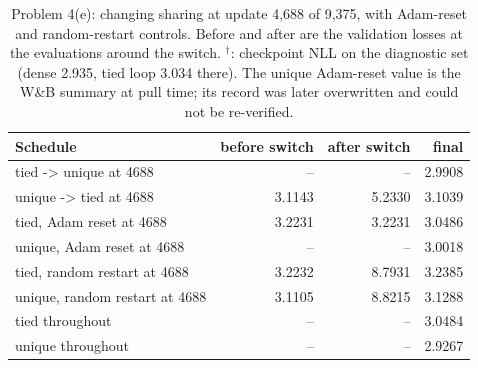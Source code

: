 \begin{table}[H]\centering\small\caption{Problem 4(e): changing sharing at update 4,688 of 9,375, with Adam-reset and random-restart controls. Before and after are the validation losses at the evaluations around the switch. $^\dagger$: checkpoint NLL on the diagnostic set (dense 2.935, tied loop 3.034 there). The unique Adam-reset value is the W\&B summary at pull time; its record was later overwritten and could not be re-verified.}\label{tab:p4switch}\begin{tabular}{lrrr}\toprule Schedule & before switch & after switch & final \\ \midrule
tied -> unique at 4688 & -- & -- & 2.9908 \\
unique -> tied at 4688 & 3.1143 & 5.2330 & 3.1039 \\
tied, Adam reset at 4688 & 3.2231 & 3.2231 & 3.0486 \\
unique, Adam reset at 4688 & -- & -- & 3.0018 \\
tied, random restart at 4688 & 3.2232 & 8.7931 & 3.2385 \\
unique, random restart at 4688 & 3.1105 & 8.8215 & 3.1288 \\
tied throughout & -- & -- & 3.0484 \\
unique throughout & -- & -- & 2.9267 \\
\bottomrule\end{tabular}\end{table}